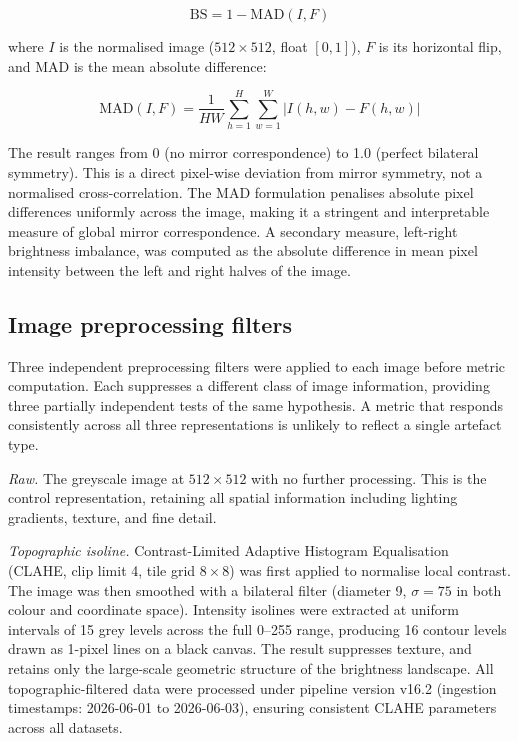\documentclass[11pt,a4paper]{article}
\begin{document}
\begin{equation}
  \mathrm{BS} = 1 - \mathrm{MAD}(I, F)
\end{equation}

where $I$ is the normalised image ($512 \times 512$, float $[0,1]$), $F$ is its
horizontal flip, and $\mathrm{MAD}$ is the mean absolute difference:

\begin{equation}
  \mathrm{MAD}(I, F) = \frac{1}{HW} \sum_{h=1}^{H} \sum_{w=1}^{W}
  \bigl| I(h,w) - F(h,w) \bigr|
\end{equation}

The result ranges from 0 (no mirror correspondence) to 1.0 (perfect bilateral
symmetry). This is a direct pixel-wise deviation from mirror symmetry, not a
normalised cross-correlation. The MAD formulation penalises absolute pixel
differences uniformly across the image, making it a stringent and interpretable
measure of global mirror correspondence. A secondary measure, left-right
brightness imbalance, was computed as the absolute difference in mean pixel
intensity between the left and right halves of the image.

\subsection{Image preprocessing filters}

Three independent preprocessing filters were applied to each image before metric
computation. Each suppresses a different class of image information, providing
three partially independent tests of the same hypothesis. A metric that responds
consistently across all three representations is unlikely to reflect a single
artefact type.

\textit{Raw.} The greyscale image at $512 \times 512$ with no further
processing. This is the control representation, retaining all spatial
information including lighting gradients, texture, and fine detail.

\textit{Topographic isoline.} Contrast-Limited Adaptive Histogram Equalisation
(CLAHE, clip limit 4, tile grid $8 \times 8$) was first applied to normalise
local contrast. The image was then smoothed with a bilateral filter (diameter 9,
$\sigma = 75$ in both colour and coordinate space). Intensity isolines were
extracted at uniform intervals of 15 grey levels across the full 0--255 range,
producing 16 contour levels drawn as 1-pixel lines on a black canvas. The result
suppresses texture, and retains only the large-scale geometric structure of the
brightness landscape. All topographic-filtered data were processed under
pipeline version v16.2 (ingestion timestamps: 2026-06-01 to 2026-06-03),
ensuring consistent CLAHE parameters across all datasets.
\end{document}
